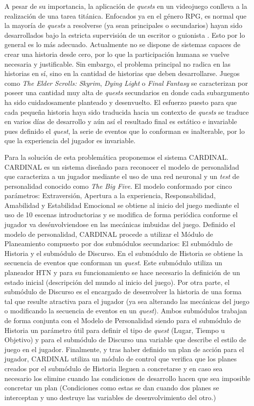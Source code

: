 A pesar de su importancia, la aplicación de \textit{quests} en un videojuego conlleva a la realización de una tarea titánica. Enfocados ya en el género \ac{RPG}, es normal que la mayoría de \textit{quests} a resolverse (ya sean principales o secundarios) hayan sido desarrollados bajo la estricta supervisión de un escritor o guionista \cite{cheong2016planning}. Esto por lo general es lo más adecuado. Actualmente no se dispone de sistemas capaces de crear una historia desde cero, por lo que la participación humana se vuelve necesaria y justificable. Sin embargo, el problema principal no radica en las historias en sí, sino en la cantidad de historias que deben desarrollarse. Juegos como \textit{The Elder Scrolls: Skyrim}, \textit{Dying Light} o \textit{Final Fantasy} se caracterizan por poseer una cantidad muy alta de \textit{quests} secundarios en donde cada subargumento ha sido cuidadosamente planteado y desenvuelto. El esfuerzo puesto para que cada pequeña historia haya sido traducida hacia un contexto de \textit{quests} se traduce en varios días de desarrollo y aún así el resultado final es estático e invariable pues definido el \textit{quest}, la serie de eventos que lo conforman es inalterable, por lo que la experiencia del jugador es invariable. 

Para la solución de esta problemática proponemos el sistema CARDINAL. CARDINAL es un sistema diseñado para reconocer el modelo de personalidad que caracteriza a un jugador mediante el uso de una red neuronal y un \textit{test} de personalidad conocido como \textit{The Big Five}. El modelo conformado por cinco parámetros: Extraversión, Apertura a la experiencia, Responsabilidad, Amabilidad y Estabilidad Emocional se obtiene al inicio del juego mediante el uso de 10 escenas introductorias  y se modifica de forma periódica conforme el jugador va desénvolviendose en las mecánicas imbuidas del juego.  Definido el modelo de personalidad, CARDINAL procede a utilizar el Módulo de Planeamiento compuesto por dos submódulos secundarios: El submódulo de Historia y el submódulo de Discurso. En el submódulo de Historia se obtiene la secuencia de eventos que conforman un \textit{quest}. Este submódulo utiliza un planeador \ac{HTN} y para su funcionamiento se hace necesario la definición de un estado inicial (descripción del mundo al inicio del juego). Por otra parte, el submódulo de Discurso es el encargado de desenvolver la historia de una forma tal que resulte atractiva para el jugador (ya sea alterando las mecánicas del juego o modificando la secuencia de eventos en un \textit{quest}). Ambos submódulos trabajan de forma conjunta con el Modelo de Personalidad  siendo para el submódulo de Historia un parámetro útil para definir el tipo de \textit{quest} (Lugar, Tiempo u Objetivo) y para el submódulo de Discurso una variable que describe el estilo de juego en el jugador. Finalmente, y tras haber definido un plan de acción para el jugador, CARDINAL utiliza un módulo de control que verifica que los planes creados por el submódulo de Historia lleguen a concretarse y en caso sea necesario los elimine cuando las condiciones de desarrollo hacen que sea imposible concretar un plan (Condiciones como estas se dan cuando dos planes se interceptan y uno destruye las variables de desenvolvimiento del otro.)

